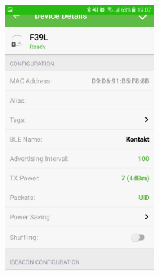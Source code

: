 \documentclass[handout]{beamer}
\begin{document}
\begin{frame}
\begin{columns}[t]
\begin{figure}
\includegraphics[width=0.6\textwidth]{../figures/kontaktapp2.png}
\end{figure}

\end{columns}
\end{frame}
\end{document}
